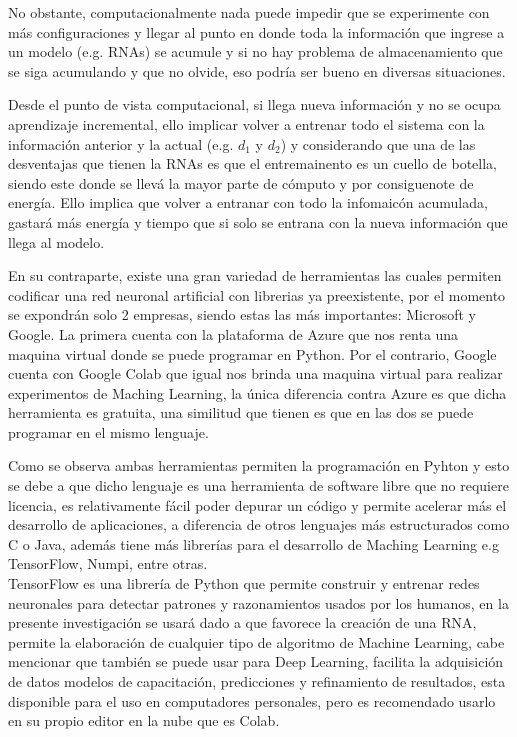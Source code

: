 No obstante,  computacionalmente nada puede 
        impedir que se experimente con más configuraciones y llegar al punto en donde toda la información 
        que ingrese a un modelo (e.g. RNAs) se acumule y si no hay problema de almacenamiento que se siga acumulando y que no olvide, 
        eso podría ser bueno en diversas situaciones.

Desde el punto de vista computacional, si llega nueva información y no se ocupa aprendizaje incremental, ello implicar volver a entrenar todo el sistema con la información anterior y la actual (e.g. $d_{1}$ y $d_{2}$) y considerando que una de las desventajas que tienen la RNAs es que el entremainento es un cuello de botella, siendo este donde se llevá la mayor parte de cómputo y por consiguenote de energía. Ello implica que volver a entranar con todo la infomaicón acumulada, gastará más energía y tiempo que si solo se entrana con la nueva información que llega al modelo.

 En su contraparte,  existe una gran variedad de herramientas las cuales permiten codificar una red neuronal artificial con librerias ya preexistente, por el momento se expondrán solo 2 empresas, siendo estas las más 
        importantes: Microsoft y Google. La primera cuenta con la plataforma de Azure que nos renta una maquina virtual donde se puede 
        programar en Python.  Por el contrario, Google cuenta con Google Colab que igual nos brinda una maquina virtual para realizar experimentos de Maching
        Learning, la \'unica diferencia contra Azure es que dicha herramienta es gratuita, una similitud que tienen es que en las dos se puede programar en el mismo lenguaje.

        Como se observa ambas herramientas permiten la programaci\'on en Pyhton y esto se debe a que dicho lenguaje es una herramienta de 
        software libre que no requiere licencia, es relativamente fácil poder depurar un código y permite acelerar 
        más el desarrollo de aplicaciones,  a diferencia de otros lenguajes más estructurados 
        como C o Java, adem\'as tiene m\'as librerías para el desarrollo de Maching Learning e.g TensorFlow, Numpi, entre otras. \\

        TensorFlow es una librería de Python que permite construir y entrenar redes neuronales para detectar patrones y
        razonamientos usados por los humanos, en la presente investigaci\'on se usar\'a dado a que favorece la creaci\'on de una RNA,
        permite la elaboraci\'on de cualquier tipo de algoritmo de Machine Learning, cabe mencionar que también se puede usar para Deep Learning, facilita la adquisici\'on de datos
        modelos de capacitaci\'on, predicciones y refinamiento de resultados, esta disponible para el uso en computadores personales, pero
        es recomendado usarlo en su propio editor en la nube que es Colab. \\ 

